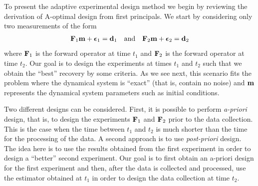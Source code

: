 \documentclass[11pt]{article}
\newcommand{\bfF}	{{\bf{F}}}
\newcommand{\bfd}	{{\bf{d}}}
\newcommand{\bfm}	{{\bf{m}}}
\newcommand{\bfepsilon} {{\boldsymbol \epsilon}}
\begin{document}
To present the adaptive experimental design method we begin by reviewing the derivation of A-optimal design from first principals. We start by considering only two measurements  of the form
\begin{eqnarray}
\label{data}
\bfF_{1} \bfm + \bfepsilon_1 = \bfd_{1}\quad {\rm and} \quad \bfF_{2} \bfm + \bfepsilon_2 = \bfd_{2}
\end{eqnarray}
where $\bfF_{1}$ is the forward operator at time $t_{1}$ and $\bfF_{2}$ is the forward operator 
at time $t_{2}$.
Our goal is to design the experiments at times $t_{1}$ and $t_{2}$ such that we obtain the ``best''
recovery by some criteria.
As we see next, this scenario fits the problem where the dynamical system is ``exact'' (that is, contain
no noise) and $\bfm$ represents the dynamical system parameters such as initial conditions.

Two different designs can be considered. First, it is possible to perform {\em a-priori} design, that is,
to design the experiments $\bfF_{1}$ and $\bfF_{2}$ prior to the data collection. This is the case
when the time between $t_{1}$ and $t_{2}$ is much shorter than the time for the processing
of the data. A second approach is to use {\em post-priori} design. The idea here is to use the 
results obtained from the first experiment in order to design a ``better'' second experiment.
Our goal is to first obtain an a-priori design for the first experiment
and then, after the data is collected and processed, use the estimator
obtained at $t_{1}$ in order  to design the data collection
at time $t_{2}$.
\end{document}
